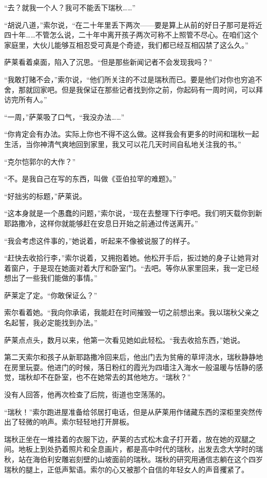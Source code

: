 \documentclass[AutoFakeBold=true]{book}
\begin{document}
``去？就我一个人？我可不能丢下瑞秋……''

``胡说八道，''索尔说，``在二十年里丢下两次——要是算上从前的好日子那可是将近四十年……不管怎么说，二十年中离开孩子两次可称不上照管不尽心。在咱们这个家庭里，大伙儿能够互相忍受可真是个奇迹，我们都已经互相囚禁了这么久。''

萨莱看着桌面，陷入了沉思。``但是那些新闻记者不会发现我吗？''

``我敢打赌不会，''索尔说，``他们所关注的不过是瑞秋而已。要是他们对你也穷追不舍，那就回家吧。但是我保证在那些记者找到你之前，你起码有一周时间，可以拜访完所有人。''

``一周，''萨莱吸了口气，``我没办法……''

``你肯定会有办法。实际上你也不得不这么做。这样我会有更多的时间和瑞秋一起生活，当你神清气爽地回到家里，我又可以花几天时间自私地关注我的书。''

``克尔恺郭尔的大作？''

``不。是我自己在写的东西，叫做《亚伯拉罕的难题》。''

``好拙劣的标题，''萨莱说。

``这本身就是一个愚蠢的问题，''索尔说，``现在去整理下行李吧。我们明天载你到新耶路撒冷，这样你就能够赶在安息日开始之前通过传送离开。''

``我会考虑这件事的，''她说着，听起来不像被说服了的样子。

``赶快去收拾行李，''索尔说着，又拥抱着她。他松开手后，扳过她的身子让她背对着窗户，于是现在她面对着大厅和卧室门。``去吧。等你从家里回来，我一定已经想出了一些我们能做的事情。''

萨莱定了定。``你敢保证么？''

索尔看着她。``我向你承诺，我能赶在时间摧毁一切之前想出来。我以瑞秋父亲之名起誓，我必定能找到办法。''

萨莱点点头，数月以来，他第一次看见她如此轻松。``我去收拾东西，''她说。

\vspace*{1em}

第二天索尔和孩子从新耶路撒冷回来后，他出门去为贫瘠的草坪浇水，瑞秋静静地在房里玩耍。他进门的时候，落日粉红的霞光为四墙注入海水一般温暖与恬静的感觉，瑞秋却不在卧室，也不在她常去的其他地方。``瑞秋？''

没有人回答，他再次检查了后院，街道也空荡荡的。

``瑞秋！''索尔跑进屋准备给邻居打电话，但是从萨莱用作储藏东西的深柜里突然传出了轻微的响声。索尔轻轻地打开屏板。

瑞秋正坐在一堆挂着的衣服下边，萨莱的古式松木盒子打开着，放在她的双腿之间。地板上到处扔着照片和全息画片，都是高中时代的瑞秋，出发去念大学时的瑞秋，站在海伯利安雕岩刻壁的山坡面前的瑞秋。瑞秋的研究用通信志躺在这个四岁瑞秋的腿上，正低声絮语。索尔的心又被那个自信的年轻女人的声音攫紧了。
\end{document}
